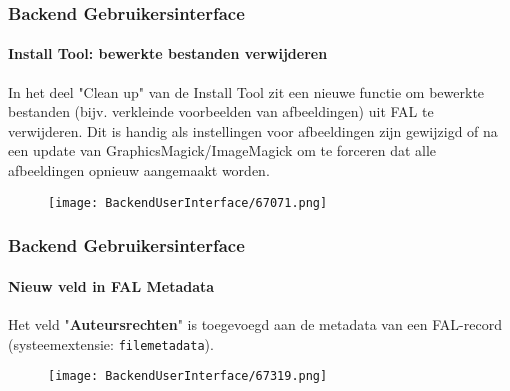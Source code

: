\begin{frame}[fragile]
	\frametitle{Backend Gebruikersinterface}
	\framesubtitle{Install Tool: bewerkte bestanden verwijderen}

	In het deel "Clean up" van de Install Tool zit een nieuwe functie om bewerkte bestanden
	(bijv. verkleinde voorbeelden van afbeeldingen) uit FAL te verwijderen.\newline
	Dit is handig als instellingen voor afbeeldingen zijn gewijzigd of na een update van
	GraphicsMagick/ImageMagick om te forceren dat alle afbeeldingen opnieuw aangemaakt
	worden.

	\begin{figure}
		\texttt{[image: BackendUserInterface/67071.png]}
	\end{figure}

\end{frame}

\begin{frame}[fragile]
	\frametitle{Backend Gebruikersinterface}
	\framesubtitle{Nieuw veld in FAL Metadata}

	Het veld "\textbf{Auteursrechten}" is toegevoegd aan de metadata van een FAL-record
	(systeemextensie: \texttt{filemetadata}).

	\begin{figure}
		\texttt{[image: BackendUserInterface/67319.png]}
	\end{figure}

\end{frame}


